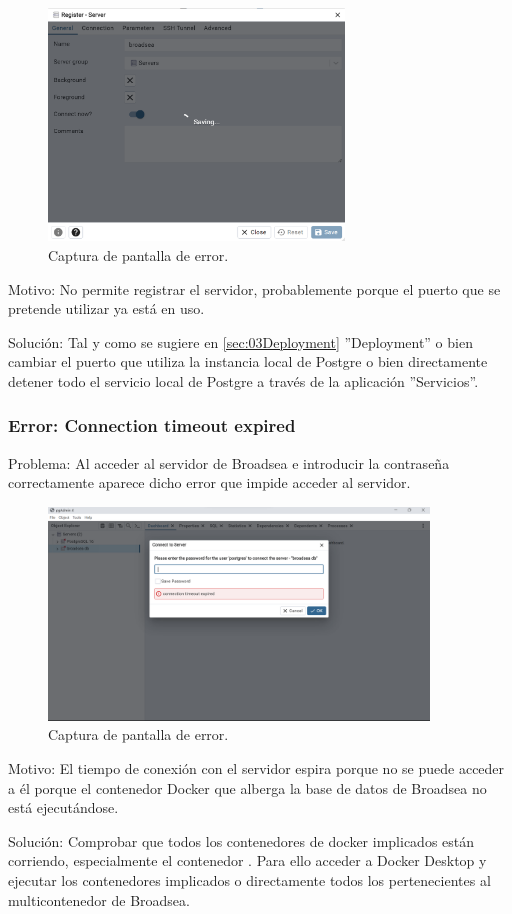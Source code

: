     \begin{figure}[H]
    \centering
    \includegraphics[width=0.70\textwidth]{figures/error03Saving.png}
     \caption{Captura de pantalla de error.}
    \label{fig:error03Saving}
    \end{figure}

Motivo: No permite registrar el servidor, probablemente porque el puerto que se pretende utilizar ya está en uso. 

Solución: Tal y como se sugiere en \ref{sec:03Deployment} ''Deployment'' o bien cambiar el puerto que utiliza la instancia local de Postgre o bien directamente detener todo el servicio local de Postgre a través de la aplicación ''Servicios''.

\subsubsection{Error: Connection timeout expired}
Problema: Al acceder al servidor de Broadsea e introducir la contraseña correctamente aparece dicho error que impide acceder al servidor.

    \begin{figure}[H]
    \centering
    \includegraphics[width=0.90\textwidth]{figures/Error03ConnTime.png}
     \caption{Captura de pantalla de error.}
    \label{fig:Error03ConnTime}
    \end{figure}
    
Motivo: El tiempo de conexión con el servidor espira porque no se puede acceder a él porque el contenedor Docker que alberga la base de datos de Broadsea no está ejecutándose.

Solución:  Comprobar que todos los contenedores de docker implicados están corriendo, especialmente el contenedor . Para ello acceder a Docker Desktop y ejecutar los contenedores implicados o directamente todos los pertenecientes al multicontenedor de Broadsea. 

 
